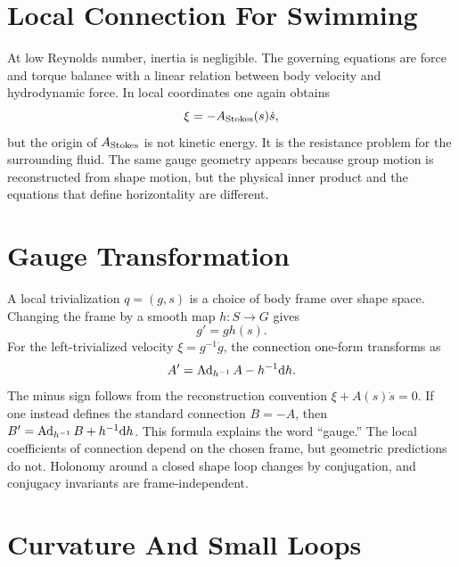 \section{Local Connection For Swimming}
\label{sec:local-connection-swimming}

At low Reynolds number, inertia is negligible.  The governing equations are
force and torque balance with a linear relation between body velocity and
hydrodynamic force.  In local coordinates one again obtains
\[
        \xi=-A_{\rm Stokes}(s)\dot s,
\]
but the origin of \(A_{\rm Stokes}\) is not kinetic energy.  It is the
resistance problem for the surrounding fluid.  The same gauge geometry appears
because group motion is reconstructed from shape motion, but the physical
inner product and the equations that define horizontality are different.

\section{Gauge Transformation}
\label{sec:gauge-transformation-taxonomy}

A local trivialization \(q=(g,s)\) is a choice of body frame over shape space.
Changing the frame by a smooth map \(h:S\to G\) gives
\[
        g'=g h(s).
\]
For the left-trivialized velocity \(\xi=g^{-1}\dot g\), the connection
one-form transforms as
\[
        A'
        =
        \operatorname{Ad}_{h^{-1}}A-h^{-1}\mathrm{d} h .
\]
The minus sign follows from the reconstruction convention
\(\xi+A(s)\dot s=0\). If one instead defines the standard connection
\(B=-A\), then \(B'=\operatorname{Ad}_{h^{-1}}B+h^{-1}\mathrm{d} h\). This formula explains the
word ``gauge.''  The local coefficients of connection depend on the chosen
frame, but geometric predictions do not. Holonomy around a closed shape loop
changes by conjugation, and conjugacy invariants are frame-independent.

\section{Curvature And Small Loops}
\label{sec:gauge-curvature-taxonomy}

